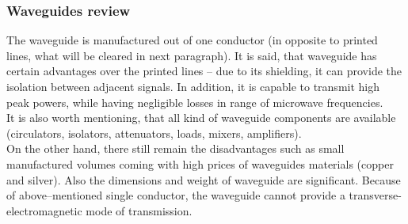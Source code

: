 \documentclass[eng,printmode]{mgr}
\begin{document}
	

\subsubsection{Waveguides review }
The waveguide is manufactured out of one conductor (in opposite to printed lines, what will be cleared in next paragraph). It is said, that waveguide has certain advantages over the printed lines
-- due to its shielding, it can provide the isolation between adjacent signals. In addition, it is capable to transmit high peak powers, while having negligible losses in range of microwave frequencies.\\
It is also worth mentioning, that all kind of waveguide components are available (circulators, isolators, attenuators, loads, mixers, amplifiers).
\\
On the other hand, there still remain the disadvantages such as small manufactured volumes coming with high prices of waveguides materials (copper and silver). Also the dimensions and weight of waveguide are significant. Because of above--mentioned single conductor, the waveguide cannot provide a transverse-electromagnetic mode of transmission.
\end{document}
